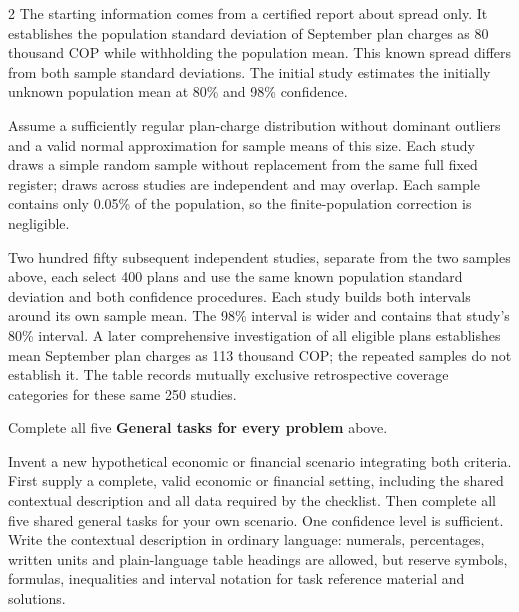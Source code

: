 \begin{multicols}{2}
The starting information comes from a certified report about spread only. It establishes the population standard deviation of September plan charges as 80 thousand COP while withholding the population mean. This known spread differs from both sample standard deviations. The initial study estimates the initially unknown population mean at 80\% and 98\% confidence.

Assume a sufficiently regular plan-charge distribution without dominant outliers and a valid normal approximation for sample means of this size. Each study draws a simple random sample without replacement from the same full fixed register; draws across studies are independent and may overlap. Each sample contains only 0.05\% of the population, so the finite-population correction is negligible.

Two hundred fifty subsequent independent studies, separate from the two samples above, each select 400 plans and use the same known population standard deviation and both confidence procedures. Each study builds both intervals around its own sample mean. The 98\% interval is wider and contains that study's 80\% interval. A later comprehensive investigation of all eligible plans establishes mean September plan charges as 113 thousand COP; the repeated samples do not establish it. The table records mutually exclusive retrospective coverage categories for these same 250 studies.


Complete all five \textbf{General tasks for every problem} above.

\columnbreak


Invent a new hypothetical economic or financial scenario integrating both criteria. First supply a complete, valid economic or financial setting, including the shared contextual description and all data required by the checklist. Then complete all five shared general tasks for your own scenario. One confidence level is sufficient. Write the contextual description in ordinary language: numerals, percentages, written units and plain-language table headings are allowed, but reserve symbols, formulas, inequalities and interval notation for task reference material and solutions.


\end{multicols}
